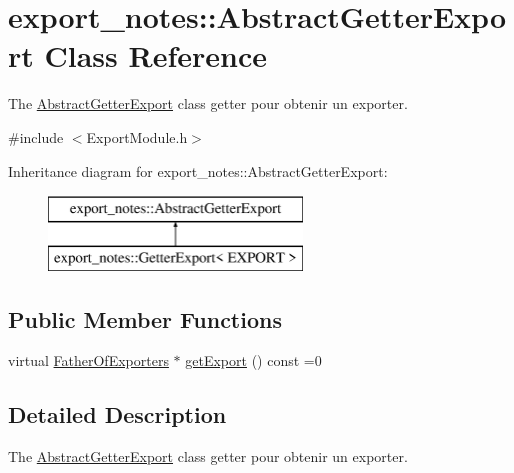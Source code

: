 \hypertarget{classexport__notes_1_1_abstract_getter_export}{\section{export\-\_\-notes\-:\-:Abstract\-Getter\-Export Class Reference}
\label{classexport__notes_1_1_abstract_getter_export}
}


The \hyperlink{classexport__notes_1_1_abstract_getter_export}{Abstract\-Getter\-Export} class getter pour obtenir un exporter.  




{\ttfamily \#include $<$Export\-Module.\-h$>$}

Inheritance diagram for export\-\_\-notes\-:\-:Abstract\-Getter\-Export\-:\begin{figure}[H]
\begin{center}
\leavevmode
\includegraphics[height=2.000000cm]{classexport__notes_1_1_abstract_getter_export}
\end{center}
\end{figure}
\subsection*{Public Member Functions}
\begin{DoxyCompactItemize}
\item 
virtual \hyperlink{classexport__notes_1_1_father_of_exporters}{Father\-Of\-Exporters} $\ast$ \hyperlink{classexport__notes_1_1_abstract_getter_export_a256c29e30db1ca9864519d6fe6da51a8}{get\-Export} () const =0
\end{DoxyCompactItemize}


\subsection{Detailed Description}
The \hyperlink{classexport__notes_1_1_abstract_getter_export}{Abstract\-Getter\-Export} class getter pour obtenir un exporter. 

